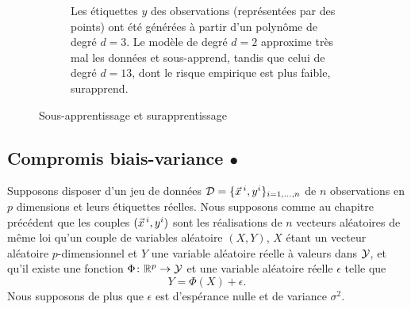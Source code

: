 \begin{figure}[h]
\begin{subfigure}[t]{0.48\textwidth}
    \caption{Les étiquettes $y$ des observations (représentées par des points)
      ont été générées à partir d'un polynôme de degré $d=3$. Le modèle de
      degré $d=2$ approxime très mal les données et sous-apprend, tandis que
      celui de degré $d=13$, dont le risque empirique est plus faible,
      surapprend.}
    \label{fig:overfit_regr}
  \end{subfigure}
  \caption{Sous-apprentissage et surapprentissage}
\end{figure}

\subsection{Compromis biais-variance $\bullet$}
\label{sec:bias_variance}
Supposons disposer d'un jeu de données $\DD = \{\xx^i, y^i\}_{i=1, \dots, n}$
de $n$ observations en $p$ dimensions et leurs étiquettes réelles. Nous
supposons comme au chapitre précédent que les couples $(\xx^i, y^i)$ sont les
réalisations de $n$ vecteurs aléatoires de même loi qu'un couple de variables
aléatoire $(X, Y)$, $X$ étant un vecteur aléatoire $p$-dimensionnel et $Y$ une
variable aléatoire réelle à valeurs dans $\mathcal{Y}$, et qu'il existe une fonction
$\Phi \colon \mathbb{R}^p \to \mathcal{Y}$ et une variable aléatoire réelle $\epsilon$
telle que
  \begin{equation}
  Y = \Phi(X) + \epsilon.
\end{equation}
Nous supposons de plus que $\epsilon$ est d'espérance nulle et de variance
$\sigma^2$.

